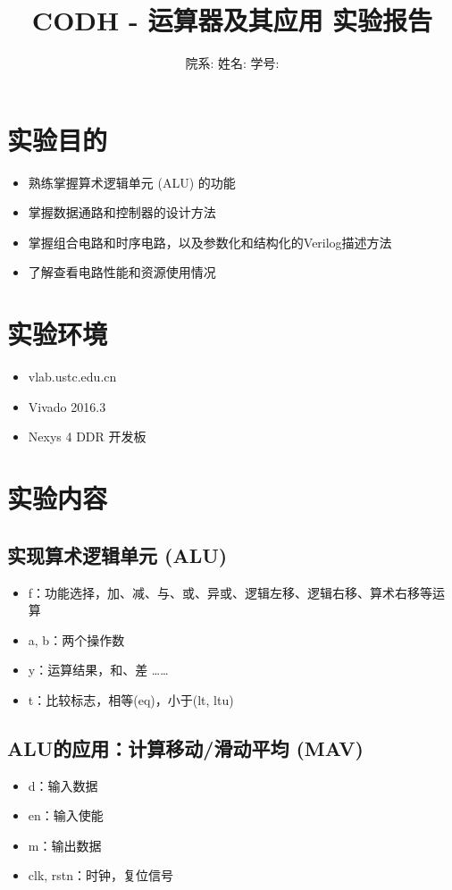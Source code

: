 \documentclass[a4paper]{article}
\title{\heiti 
CODH - 运算器及其应用 \hspace{0.3cm}实验报告}
\author{院系: \kaishu\underline{}\hspace{1.5cm}姓名: \kaishu \underline{}\hspace{1.5cm}学号: \kaishu \underline{}\hspace{1.5cm}}
\begin{document}
\maketitle

\section{实验目的}
\begin{itemize}
    \item 熟练掌握算术逻辑单元 (ALU) 的功能
    \item 掌握数据通路和控制器的设计方法
    \item 掌握组合电路和时序电路，以及参数化和结构化的Verilog描述方法
    \item 了解查看电路性能和资源使用情况
\end{itemize}

\section{实验环境}
\begin{itemize}
  \item vlab.ustc.edu.cn
  \item Vivado 2016.3
  \item Nexys 4 DDR 开发板
\end{itemize}
\section{实验内容}
\subsection{实现算术逻辑单元 (ALU) }
\begin{itemize}
  \item f：功能选择，加、减、与、或、异或、逻辑左移、逻辑右移、算术右移等运算
  \item a, b：两个操作数
  \item y：运算结果，和、差 …… 
  \item t：比较标志，相等(eq)，小于(lt, ltu)
\end{itemize}

\subsection{ALU的应用：计算移动/滑动平均 (MAV)}
\begin{itemize}
  \item d：输入数据
  \item en：输入使能
  \item m：输出数据
  \item clk, rstn：时钟，复位信号
\end{itemize}
\end{document}
